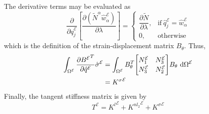 \documentclass[12pt]{article}
\numberwithin{equation}{section}
\newcommand{\pdiff}[2]{ \frac{\partial #1}{ \partial #2} }
\newcommand{\dpdiff}[2]{ \dfrac{\partial #1}{ \partial #2} }
\def\el{{ \mathcal{E} }}
\begin{document}
% 
The derivative terms may be evaluated as
% 
\begin{equation}
    \dpdiff{}{\hat{q}^\el_j}
    \left[
        \dpdiff{\left(\tilde{N}^\alpha \hat{w}^\el_\alpha\right)}{\lambda}
        \right] =
    \begin{cases}
        \dpdiff{\tilde{N}}{\lambda}, & \text{if} ~ \hat{q}^\el_j = \hat{w}^\el_\alpha \\[10pt]
        0,                           & \text{otherwise}
    \end{cases}
\end{equation}
% 
which is the definition of the strain-displacement matrix \(B_\theta\). Thus,
\begin{equation}
    \begin{aligned}
        \int_{\Omega^\el} \pdiff{{B^\el}^T}{\hat{q}^\el} \hat{\sigma}^\el
         & =
        \int_{\Omega^\el}
        B_\theta^T
        {\renewcommand\arraystretch{1.15}
        \begin{bmatrix}
            N^\el_{1} & N^\el_{3} \\
            N^\el_{3} & N^\el_{2}
        \end{bmatrix}}
        B_\theta ~ \text{d}\Omega^\el \\
         & = {K^\sigma}^\el
    \end{aligned}
\end{equation}
% 
Finally, the tangent stiffness matrix is given by
% 
\begin{equation}
    T^\el = {K^l}^\el + {K^{nl_2}}^\el + {K^\sigma}^\el
\end{equation}
\end{document}
